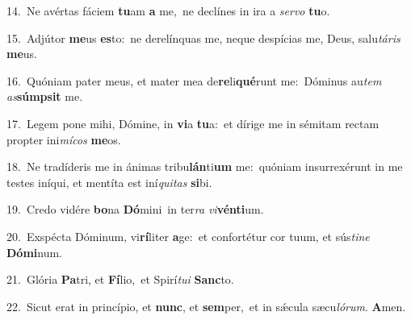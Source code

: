 {\numbfont\textcolor{\numbcolor}{14.}}~Ne avértas fáciem \textbf{tu}\-am \textbf{a} me,~\star ne declínes in ira a \textit{ser}\-\textit{vo} \textbf{tu}\-o.\par
{\numbfont\textcolor{\numbcolor}{15.}}~Adjútor \textbf{me}\-us \textbf{es}\-to:~\star ne derelínquas me, neque despícias me, Deus, salu\-\textit{tá}\-\textit{ris} \textbf{me}\-us.\par
{\numbfont\textcolor{\numbcolor}{16.}}~Quóniam pater meus, et mater mea de\-\textbf{re}\-li\-\textbf{qué}\-runt me:~\star Dóminus au\textit{tem} \textit{as}\-\textbf{súmp}\textbf{sit} me.\par
{\numbfont\textcolor{\numbcolor}{17.}}~Legem pone mihi, Dómine, in \textbf{vi}\-a \textbf{tu}\-a:~\star et dírige me in sémitam rectam propter ini\-\textit{mí}\-\textit{cos} \textbf{me}\-os.\par
{\numbfont\textcolor{\numbcolor}{18.}}~Ne tradíderis me in ánimas tribu\-\textbf{lán}\-ti\textbf{um} me:~\star quóniam insurrexérunt in me testes iníqui, et mentíta est iní\-\textit{qui}\-\textit{tas} \textbf{si}\-bi.\par
{\numbfont\textcolor{\numbcolor}{19.}}~Credo vidére \textbf{bo}\-na \textbf{Dó}\-mini~\star in ter\textit{ra} \textit{vi}\-\textbf{vén}\textbf{ti}um.\par
{\numbfont\textcolor{\numbcolor}{20.}}~Exspécta Dóminum, vi\-\textbf{rí}\-liter \textbf{a}\-ge:~\star et confortétur cor tuum, et sús\-\textit{ti}\-\textit{ne} \textbf{Dó}\-\textbf{mi}num.\par
{\numbfont\textcolor{\numbcolor}{21.}}~Glória \textbf{Pa}\-tri, et \textbf{Fí}\-lio,~\star et Spirí\-\textit{tu}\-\textit{i} \textbf{Sanc}\-to.\par
{\numbfont\textcolor{\numbcolor}{22.}}~Sicut erat in princípio, et \textbf{nunc}\-, et \textbf{sem}\-per,~\star et in sǽcula sæcu\-\textit{ló}\-\textit{rum}. \textbf{A}\-men.\par
